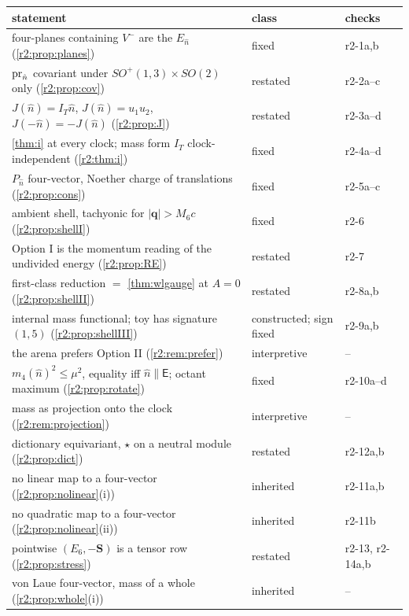 {\small
\renewcommand{\arraystretch}{1.12}
\begin{longtable}{@{}>{\raggedright\arraybackslash}p{9.0cm}>{\raggedright\arraybackslash}p{2.8cm}>{\raggedright\arraybackslash}p{2.6cm}@{}}
\toprule
statement & class & checks\\
\midrule
\endhead
four-planes containing $V^-$ are the $E_{\hat n}$ (\cref{r2:prop:planes}) & fixed & r2-1a,b\\
$\operatorname{pr}_{\hat n}$ covariant under $SO^+(1,3)\times SO(2)$ only (\cref{r2:prop:cov}) & restated & r2-2a--c\\
$J(\hat n)=I_T\hat n$, $J(\hat n)=u_1u_2$, $J(-\hat n)=-J(\hat n)$ (\cref{r2:prop:J}) & restated & r2-3a--d\\
\cref{thm:i} at every clock; mass form $I_T$ clock-independent (\cref{r2:thm:i}) & fixed & r2-4a--d\\
$P_{\hat n}$ four-vector, Noether charge of translations (\cref{r2:prop:cons}) & fixed & r2-5a--c\\
ambient shell, tachyonic for $|\mathbf q|>M_6c$ (\cref{r2:prop:shellI}) & fixed & r2-6\\
Option I is the momentum reading of the undivided energy (\cref{r2:prop:RE}) & restated & r2-7\\
first-class reduction $=$ \cref{thm:wlgauge} at $A=0$ (\cref{r2:prop:shellII}) & restated & r2-8a,b\\
internal mass functional; toy has signature $(1,5)$ (\cref{r2:prop:shellIII}) & constructed; sign fixed & r2-9a,b\\
the arena prefers Option II (\cref{r2:rem:prefer}) & interpretive & --\\
$m_4(\hat n)^2\le\mu^2$, equality iff $\hat n\parallel\boldsymbol{\mathsf E}$; octant maximum (\cref{r2:prop:rotate}) & fixed & r2-10a--d\\
mass as projection onto the clock (\cref{r2:rem:projection}) & interpretive & --\\
dictionary equivariant, $\star$ on a neutral module (\cref{r2:prop:dict}) & restated & r2-12a,b\\
no linear map to a four-vector (\cref{r2:prop:nolinear}(i)) & inherited & r2-11a,b\\
no quadratic map to a four-vector (\cref{r2:prop:nolinear}(ii)) & inherited & r2-11b\\
pointwise $(E_6,-\mathbf S)$ is a tensor row (\cref{r2:prop:stress}) & restated & r2-13, r2-14a,b\\
von Laue four-vector, mass of a whole (\cref{r2:prop:whole}(i)) & inherited & --\\

\end{longtable}}
